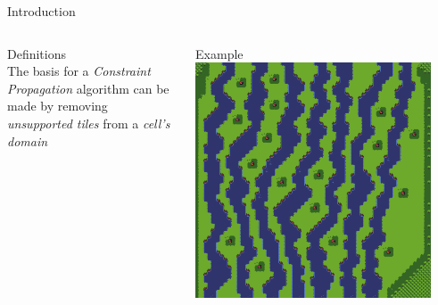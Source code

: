 \documentclass{beamer}
\begin{document}
  \begin{frame}[fragile]{Introduction}
    \begin{columns}[T,onlytextwidth]
        \begin{block}{Definitions}
          \hfill \\
          The basis for a \textit{Constraint Propagation} algorithm
          can be made by removing \textit{unsupported tiles} from
          a \textit{cell's domain}
        \end{block}
        \begin{block}{Example}
          \includegraphics[width=0.9\textwidth]{img/forestmicro_64x64.pdf}
        \end{block}
    \end{columns}
  \end{frame}


\end{document}
